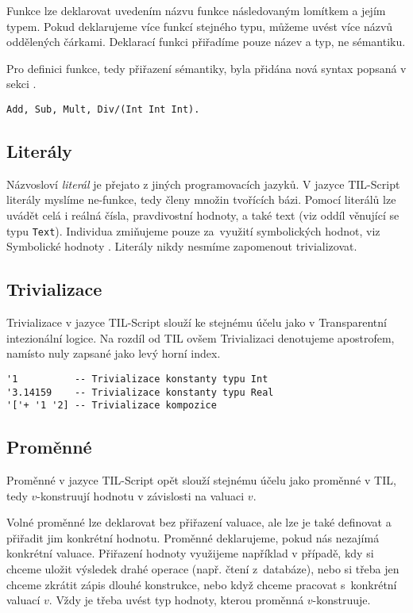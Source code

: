 Funkce lze deklarovat uvedením názvu funkce následovaným lomítkem a jejím typem. Pokud deklarujeme
více funkcí stejného typu, můžeme uvést více názvů oddělených čárkami. Deklarací funkci přiřadíme
pouze název a typ, ne sémantiku.

Pro definici funkce, tedy přiřazení sémantiky, byla přidána nová syntax popsaná v sekci
.

\begin{lstlisting}[caption={Deklarace funkcí}]
Add, Sub, Mult, Div/(Int Int Int).
\end{lstlisting}

\subsection{Literály}

Názvosloví \textit{literál} je přejato z jiných programovacích jazyků. V jazyce TIL-Script literály
myslíme ne-funkce, tedy členy množin tvořících bázi. Pomocí literálů lze uvádět celá i reálná
čísla, pravdivostní hodnoty, a také text (viz oddíl  věnující se typu
\lstinline{Text}). Individua zmiňujeme pouze za~využití symbolických hodnot, viz Symbolické hodnoty
. Literály nikdy nesmíme zapomenout trivializovat.

\subsection{Trivializace}

Trivializace v jazyce TIL-Script slouží ke stejnému účelu jako v Transparentní intezionální logice.
Na rozdíl od TIL ovšem Trivializaci denotujeme apostrofem, namísto nuly zapsané jako levý horní
index.

\begin{lstlisting}[caption={Příklad Trivializace.}]
'1          -- Trivializace konstanty typu Int
'3.14159    -- Trivializace konstanty typu Real
'['+ '1 '2] -- Trivializace kompozice
\end{lstlisting}

\subsection{Proměnné}

Proměnné v jazyce TIL-Script opět slouží stejnému účelu jako proměnné v TIL, tedy $v$-konstruují
hodnotu v závislosti na valuaci $v$.

Volné proměnné lze deklarovat bez přiřazení valuace, ale lze je také definovat a přiřadit jim
konkrétní hodnotu. Proměnné deklarujeme, pokud nás nezajímá konkrétní valuace. Přiřazení hodnoty
využijeme například v případě, kdy si chceme uložit výsledek drahé operace (např. čtení
z~databáze), nebo si třeba jen chceme zkrátit zápis dlouhé konstrukce, nebo když chceme pracovat
s~konkrétní valuací $v$. Vždy je třeba uvést typ hodnoty, kterou proměnná $v$-konstruuje.

